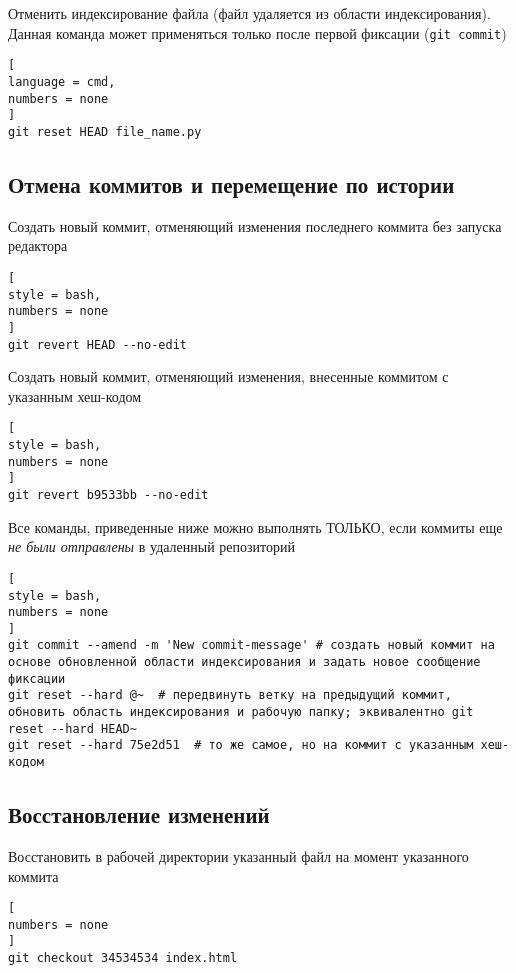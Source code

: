 \documentclass[%
	11pt,
	a4paper,
	utf8,
		]{article}
\begin{document}
Отменить индексирование файла (файл удаляется из области индексирования). Данная команда может применяться только после первой фиксации (\texttt{git commit})

\begin{lstlisting}[
language = cmd,
numbers = none
]
git reset HEAD file_name.py
\end{lstlisting}

\subsection{Отмена коммитов и перемещение по истории}


Создать новый коммит, отменяющий изменения последнего коммита без запуска редактора
\begin{lstlisting}[
style = bash,
numbers = none
]
git revert HEAD --no-edit
\end{lstlisting}

Создать новый коммит, отменяющий изменения, внесенные коммитом с указанным хеш-кодом
\begin{lstlisting}[
style = bash,
numbers = none
]
git revert b9533bb --no-edit
\end{lstlisting}

Все команды, приведенные ниже можно выполнять ТОЛЬКО, если коммиты еще \emph{не были отправлены} в удаленный репозиторий
\begin{lstlisting}[
style = bash,
numbers = none
]
git commit --amend -m 'New commit-message' # создать новый коммит на основе обновленной области индексирования и задать новое сообщение фиксации
git reset --hard @~  # передвинуть ветку на предыдущий коммит, обновить область индексирования и рабочую папку; эквивалентно git reset --hard HEAD~
git reset --hard 75e2d51  # то же самое, но на коммит с указанным хеш-кодом
\end{lstlisting}

\subsection{Восстановление изменений}

Восстановить в рабочей директории указанный файл на момент указанного коммита
\begin{lstlisting}[
numbers = none
]
git checkout 34534534 index.html
\end{lstlisting}
\end{document}
